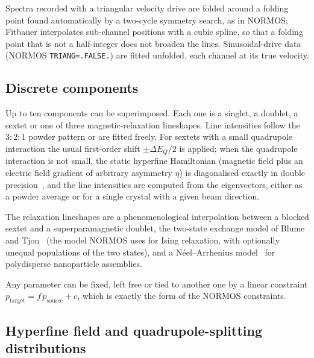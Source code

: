 \documentclass[smallcondensed]{svjour3}
\begin{document}
Spectra recorded with a triangular velocity drive are folded around a
folding point found automatically by a two-cycle symmetry search, as in
NORMOS; Fitbauer interpolates sub-channel positions with a cubic spline,
so that a folding point that is not a half-integer does not broaden the
lines. Sinusoidal-drive data (NORMOS \texttt{TRIANG=.FALSE.}) are fitted
unfolded, each channel at its true velocity.

\subsection{Discrete components}
\label{sec:discrete}

Up to ten components can be superimposed. Each one is a singlet, a
doublet, a sextet or one of three magnetic-relaxation lineshapes. Line
intensities follow the $3{:}2{:}1$ powder pattern or are fitted freely.
For sextets with a small quadrupole interaction the usual first-order
shift $\pm\Delta E_Q/2$ is applied; when the quadrupole interaction is not
small, the static hyperfine Hamiltonian (magnetic field plus an electric
field gradient of arbitrary asymmetry $\eta$) is diagonalised exactly in
double precision~\cite{Kuendig1967}, and the line intensities are computed
from the eigenvectors, either as a powder average or for a single crystal
with a given beam direction.

The relaxation lineshapes are a phenomenological interpolation between a
blocked sextet and a superparamagnetic doublet, the two-state exchange
model of Blume and Tjon~\cite{BluemeTjon1968} (the model NORMOS uses
for Ising relaxation, with optionally unequal populations of the two
states), and a N\'{e}el--Arrhenius model~\cite{Neel1949,Brown1963} for
polydisperse nanoparticle assemblies.

Any parameter can be fixed, left free or tied to another one by a linear
constraint $p_\mathrm{target} = f\,p_\mathrm{source} + c$, which is
exactly the form of the NORMOS constraints.

\subsection{Hyperfine field and quadrupole-splitting distributions}
\label{sec:dist}
\end{document}
